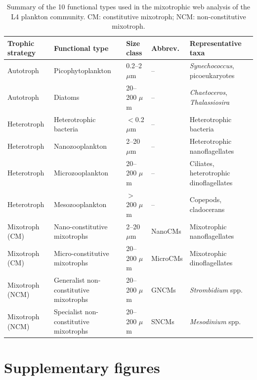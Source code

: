 \documentclass[12pt]{article}
\renewcommand{\thefigure}{S\arabic{figure}}
\begin{document}
\begin{table}[h]
	\centering
	\small
	\caption[Functional types]{Summary of the 10 functional types used in the mixotrophic web analysis of the L4 plankton community. CM: constitutive mixotroph; NCM: non-constitutive mixotroph.}
	\label{tab:functional_types}
	\begin{tabular}{p{2.2cm} p{4.5cm} p{1.8cm} p{1.6cm} p{3.7cm}}
		\toprule
		\textbf{Trophic strategy} & \textbf{Functional type} & \textbf{Size class} & \textbf{Abbrev.} & \textbf{Representative taxa} \\
		\midrule
		Autotroph & Picophytoplankton & 0.2--2 $\mu$m & -- & \textit{Synechococcus}, picoeukaryotes \\[4pt]
		Autotroph & Diatoms & 20--200 $\mu$m & -- & \textit{Chaetoceros}, \textit{Thalassiosira} \\[4pt]
		\midrule
		Heterotroph & Heterotrophic bacteria & $<$0.2 $\mu$m & -- & Heterotrophic bacteria \\[4pt]
		Heterotroph & Nanozooplankton & 2--20 $\mu$m & -- & Heterotrophic nanoflagellates \\[4pt]
		Heterotroph & Microzooplankton & 20--200 $\mu$m & -- & Ciliates, heterotrophic dinoflagellates \\[4pt]
		Heterotroph & Mesozooplankton & $>$200 $\mu$m & -- & Copepods, cladocerans \\[4pt]
		\midrule
		Mixotroph (CM) & Nano-constitutive mixotrophs & 2--20 $\mu$m & NanoCMs & Mixotrophic nanoflagellates \\[4pt]
		Mixotroph (CM) & Micro-constitutive mixotrophs & 20--200 $\mu$m & MicroCMs & Mixotrophic dinoflagellates \\[4pt]
		\midrule
		Mixotroph (NCM) & Generalist non-constitutive mixotrophs & 20--200 $\mu$m & GNCMs & \textit{Strombidium} spp. \\[4pt]
		Mixotroph (NCM) & Specialist non-constitutive mixotrophs & 20--200 $\mu$m & SNCMs & \textit{Mesodinium} spp. \\[4pt]
		\bottomrule
	\end{tabular}
\end{table}


\newpage


\section*{Supplementary figures}

\setcounter{figure}{0}
\renewcommand{\thefigure}{S\arabic{figure}}
\end{document}
